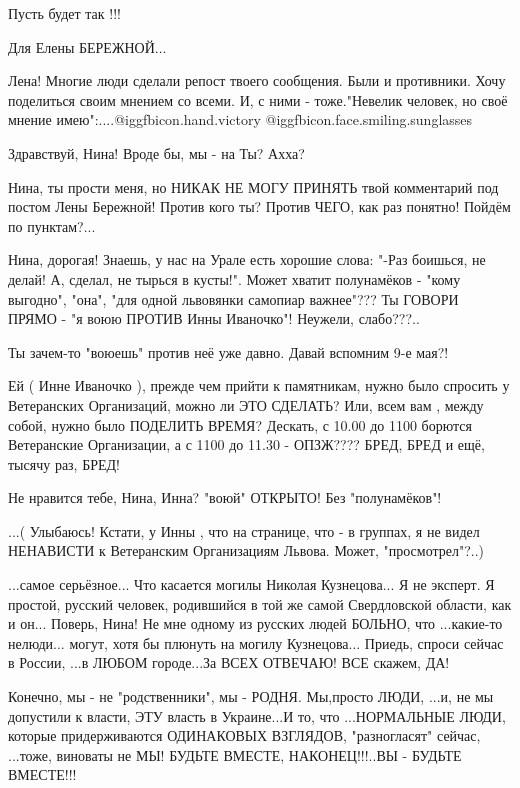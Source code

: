 \begin{itemize}
\begin{itemize}
\end{itemize} %


Пусть будет так !!!


Для Елены БЕРЕЖНОЙ...

Лена! Многие люди сделали репост твоего сообщения. Были и противники. Хочу
поделиться своим мнением со всеми. И, с ними - тоже."Невелик человек, но своё
мнение имею":....@igg{fbicon.hand.victory} @igg{fbicon.face.smiling.sunglasses} 

Здравствуй, Нина! Вроде бы, мы - на Ты? Ахха?

Нина, ты прости меня, но НИКАК НЕ МОГУ ПРИНЯТЬ твой комментарий под постом Лены
Бережной! Против кого ты? Против ЧЕГО, как раз понятно! Пойдём по пунктам?...

Нина, дорогая! Знаешь, у нас на Урале есть хорошие слова: "-Раз боишься, не
делай! А, сделал, не тырься в кусты!". Может хватит полунамёков - "кому
выгодно", "она", "для одной львовянки самопиар важнее"??? Ты ГОВОРИ ПРЯМО - "я
воюю ПРОТИВ Инны Иваночко"! Неужели, слабо???..

Ты зачем-то "воюешь" против неё уже давно. Давай вспомним 9-е мая?!

Ей ( Инне Иваночко ), прежде чем прийти к памятникам, нужно было спросить у
Ветеранских Организаций, можно ли ЭТО СДЕЛАТЬ? Или, всем вам , между собой,
нужно было ПОДЕЛИТЬ ВРЕМЯ? Дескать, с 10.00 до 1100 борются Ветеранские
Организации, а с 1100 до 11.30 - ОПЗЖ???? БРЕД, БРЕД и ещё, тысячу раз, БРЕД!

Не нравится тебе, Нина, Инна? "воюй" ОТКРЫТО! Без "полунамёков"!

...( Улыбаюсь! Кстати, у Инны , что на странице, что - в группах, я не видел
НЕНАВИСТИ к Ветеранским Организациям Львова. Может, "просмотрел"?..)

...самое серьёзное... Что касается могилы Николая Кузнецова... Я не эксперт. Я
простой, русский человек, родившийся в той же самой Свердловской области, как и
он... Поверь, Нина! Не мне одному из русских людей БОЛЬНО, что ...какие-то
нелюди... могут, хотя бы плюнуть на могилу Кузнецова... Приедь, спроси сейчас в
России, ...в ЛЮБОМ городе...За ВСЕХ ОТВЕЧАЮ! ВСЕ скажем, ДА!

Конечно, мы - не "родственники", мы - РОДНЯ. Мы,просто ЛЮДИ, ...и, не мы
допустили к власти, ЭТУ власть в Украине...И то, что ...НОРМАЛЬНЫЕ ЛЮДИ,
которые придерживаются ОДИНАКОВЫХ ВЗГЛЯДОВ, "разногласят" сейчас, ...тоже,
виноваты не МЫ! БУДЬТЕ ВМЕСТЕ, НАКОНЕЦ!!!..ВЫ - БУДЬТЕ ВМЕСТЕ!!!


\end{itemize}
